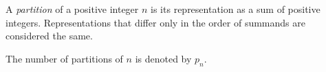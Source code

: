 

\setcounter{section}{3}
\setcounter{subsection}{4}
\setcounter{dfn}{2}

\begin{dfn}
A \emph{partition} of a positive integer $n$ is its representation as a sum of positive integers.
Representations that differ only in the order of summands are considered the same.

The number of partitions of $n$ is denoted by $p_n$.
\end{dfn}


